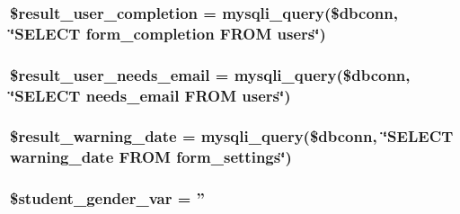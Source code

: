 \hypertarget{index_8php_a0acda6e82914708d1666c0f04deacbfb}{
\subsubsection[{\$result\-\_\-user\-\_\-completion}]{\setlength{\rightskip}{0pt plus 5cm}\$result\-\_\-user\-\_\-completion = mysqli\-\_\-query(\$dbconn, \char`\"{}\-S\-E\-L\-E\-C\-T form\-\_\-completion \-F\-R\-O\-M users\char`\"{})}}\label{index_8php_a0acda6e82914708d1666c0f04deacbfb}
\hypertarget{index_8php_aafa48812b4607e55b823158f58b39185}{
\subsubsection[{\$result\-\_\-user\-\_\-needs\-\_\-email}]{\setlength{\rightskip}{0pt plus 5cm}\$result\-\_\-user\-\_\-needs\-\_\-email = mysqli\-\_\-query(\$dbconn, \char`\"{}\-S\-E\-L\-E\-C\-T needs\-\_\-email \-F\-R\-O\-M users\char`\"{})}}\label{index_8php_aafa48812b4607e55b823158f58b39185}
\hypertarget{index_8php_a4cb926b56b2c25912bf67859aacab6d4}{
\subsubsection[{\$result\-\_\-warning\-\_\-date}]{\setlength{\rightskip}{0pt plus 5cm}\$result\-\_\-warning\-\_\-date = mysqli\-\_\-query(\$dbconn, \char`\"{}\-S\-E\-L\-E\-C\-T warning\-\_\-date \-F\-R\-O\-M form\-\_\-settings\char`\"{})}}\label{index_8php_a4cb926b56b2c25912bf67859aacab6d4}
\hypertarget{index_8php_a8c73c9da0db2b0c0fa8d07057849a37e}{
\subsubsection[{\$student\-\_\-gender\-\_\-var}]{\setlength{\rightskip}{0pt plus 5cm}\$student\-\_\-gender\-\_\-var = ''}}\label{index_8php_a8c73c9da0db2b0c0fa8d07057849a37e}
